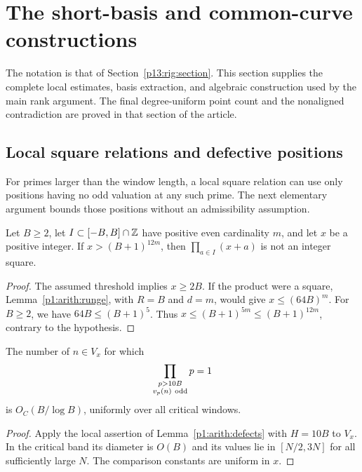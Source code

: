 \section{The short-basis and common-curve constructions}
\label{p14:comp:rigidity}

The notation is that of Section~\ref{p13:rig:section}.  This section
supplies the complete local estimates, basis extraction, and algebraic
construction used by the main rank argument.  The final
degree-uniform point count and the nonaligned contradiction are proved
in that section of the article.

\subsection{Local square relations and defective positions}

For primes larger than the window length, a local square relation
can use only positions having no odd valuation at any such prime.
The next elementary argument bounds those positions without an
admissibility assumption.

\begin{lemma}
\label{p13:rig:local-square}
Let $B\ge2$, let $I\subset[-B,B]\cap\mathbb Z$ have positive even
cardinality $m$, and let $x$ be a positive integer.  If
$x>(B+1)^{12m}$, then $\prod_{a\in I}(x+a)$ is not an integer
square.
\end{lemma}

\begin{proof}
The assumed threshold implies $x\ge2B$.
If the product were a square, Lemma~\ref{p1:arith:runge},
with $R=B$ and $d=m$, would give $x\le(64B)^m$.
For $B\ge2$, we have $64B\le(B+1)^5$.
Thus $x\le(B+1)^{5m}\le(B+1)^{12m}$,
contrary to the hypothesis.
\end{proof}

\begin{lemma}
\label{p13:rig:defective}
The number of $n\in V_x$ for which
\[
             \prod_{\substack{p>10B\\v_p(n)\ {\rm odd}}}p=1
\]
is $O_C(B/\log B)$, uniformly over all critical windows.
\end{lemma}

\begin{proof}
Apply the local assertion of Lemma~\ref{p1:arith:defects}
with $H=10B$ to $V_x$.
In the critical band its diameter is $O(B)$ and its values
lie in $[N/2,3N]$ for all sufficiently large $N$.
The comparison constants are uniform in $x$.
\end{proof}

